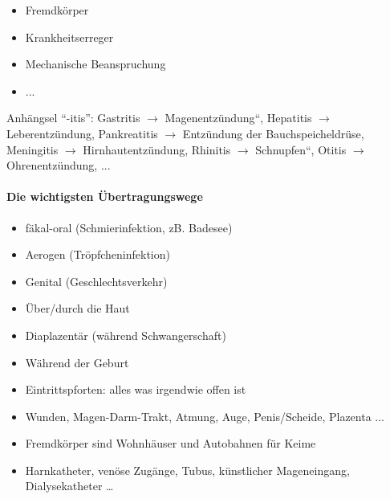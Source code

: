 \documentclass{article}
\begin{document}
\begin{itemize}
\item Fremdk\"orper

\item Krankheitserreger

\item Mechanische Beanspruchung

\item ...

\end{itemize}
Anh\"angsel
{\textquotedblleft}-itis{\textquotedblright}:
Gastritis ${\rightarrow}$
{\quotedblbase}Magenentz\"undung{\textquotedblleft}, Hepatitis
${\rightarrow}$ Leberentz\"undung, Pankreatitis ${\rightarrow}$
Entz\"undung der Bauchspeicheldr\"use, Meningitis ${\rightarrow}$
Hirnhautentz\"undung, Rhinitis ${\rightarrow}$
{\quotedblbase}Schnupfen{\textquotedblleft}, Otitis ${\rightarrow}$
Ohrenentz\"undung, ...

\paragraph[Die wichtigsten \"Ubertragungswege]{Die wichtigsten
\"Ubertragungswege}
\begin{itemize}
\item f\"akal-oral (Schmierinfektion, zB. Badesee)

\item Aerogen (Tr\"opfcheninfektion)

\item Genital (Geschlechtsverkehr)

\item \"Uber/durch die Haut

\item Diaplazent\"ar (w\"ahrend Schwangerschaft)

\item W\"ahrend der Geburt

\item Eintrittspforten: alles was irgendwie offen ist

\end{itemize}
\begin{itemize}
\item Wunden, Magen-Darm-Trakt, Atmung, Auge, Penis/Scheide, Plazenta
...

\end{itemize}
\begin{itemize}
\item Fremdk\"orper sind Wohnh\"auser und Autobahnen f\"ur Keime

\end{itemize}
\begin{itemize}
\item Harnkatheter, ven\"ose Zug\"ange, Tubus, k\"unstlicher
Mageneingang, Dialysekatheter {\dots}

\end{itemize}
\end{document}
